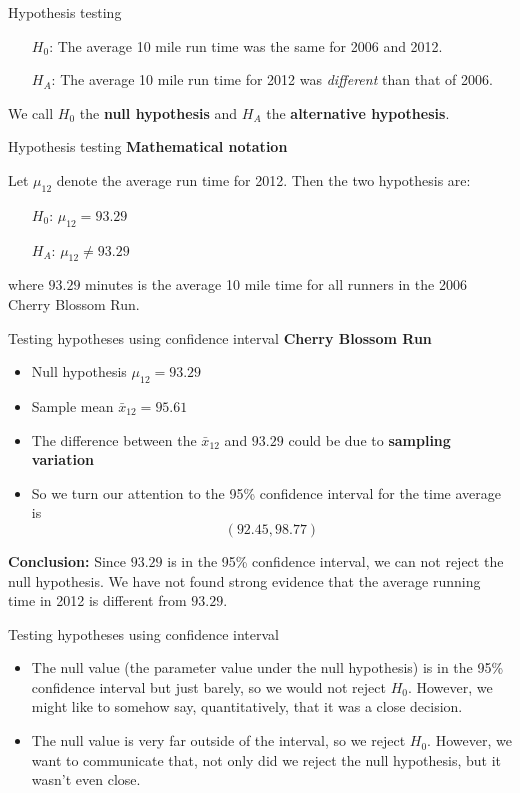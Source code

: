 \documentclass[12pt,a4paper]{beamer}
\begin{document}
\begin{frame}{Hypothesis testing}
	
	\begin{itemize}
	\setlength{\itemsep}{0mm}
	\item[$H_0$:] The average 10 mile run time was the same for 2006 and 2012.
	\item[$H_A$:] The average 10 mile run time for 2012 was \emph{different} than that of 2006.
	\end{itemize}
	We call $H_0$ the \textbf{null hypothesis} and $H_A$ the \textbf{alternative hypothesis}.
\end{frame}
\begin{frame}{Hypothesis testing}
\textbf{Mathematical notation}\vspace{0.3cm}

Let $\mu_{12}$ denote the average run time for 2012. Then the two hypothesis are:
\begin{itemize}
\item[$H_0$:] $\mu_{12} = 93.29$
\item[$H_A$:]$\mu_{12} \neq 93.29$
\end{itemize} 

where $93.29$ minutes is the average 10 mile time for all runners in the 2006 Cherry Blossom Run.
\end{frame}
\begin{frame}{Testing hypotheses using confidence interval}
	\textbf{Cherry Blossom Run}
	\begin{itemize}
		\item Null hypothesis $\mu_{12}=93.29$
		\item Sample mean $\bar{x}_{12}=95.61$
		\item The difference between the $\bar{x}_{12}$ and $93.29$ could be due to \textbf{sampling variation}
	\item  So we turn our attention to the 95\% confidence interval for the time average is
	\[(92.45,98.77)\]
\end{itemize}
\textbf{Conclusion:} Since $93.29$ is in the 95\% confidence interval, we can not reject the null hypothesis. We have not found strong evidence that the average running time in 2012 is different from $93.29$.
\end{frame}
\begin{frame}{Testing hypotheses using confidence interval}
	\begin{itemize}
	\setlength{\itemsep}{0mm}
	\item The null value (the parameter value under the null hypothesis) is in the 95\% confidence interval but just barely, so we would not reject $H_0$. However, we might like to somehow say, quantitatively, that it was a close decision.
	\item The null value is very far outside of the interval, so we reject $H_0$. However, we want to communicate that, not only did we reject the null hypothesis, but it wasn't even close.
	\end{itemize}
\end{frame}
\end{document}
